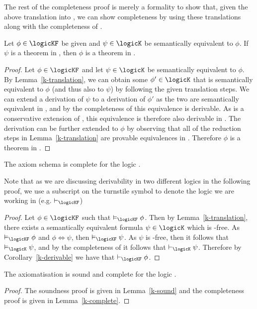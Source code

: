 The rest of the completeness proof is merely a formality to show that, given the
above translation into \logicK{}, we can show completeness by using these
translations along with the completeness of \logicK{}.

\begin{corollary}\label{k-derivable}
Let $\phi \in \logicKF$ be given and $\psi \in \logicK$ be semantically
equivalent to $\phi$.  If $\psi$ is a theorem in \logicK{}, then $\phi$ is a
theorem in \axiomKF{}.
\end{corollary}

\begin{proof}
Let $\phi \in \logicKF$ and let $\psi \in \logicK$ be semantically equivalent to
$\phi$. By Lemma~\ref{k-translation}, we can obtain some $\phi' \in \logicK$
that is semantically equivalent to $\phi$ (and thus also to $\psi$) by following
the given translation steps. We can extend a derivation of $\psi$ to a
derivation of $\phi'$ as the two are semantically equivalent in \logicK{}, and by
the completeness of \logicK{} this equivalence is derivable. As \axiomKF{} is a
conservative extension of \logicK{}, this equivalence is therefore also derivable
in \axiomKF{}. The derivation can be further extended to $\phi$ by observing that all
of the reduction steps in Lemma~\ref{k-translation} are provable equivalences
in \axiomKF{}. Therefore $\phi$ is a theorem in \axiomKF{}.
\end{proof}

\begin{lemma}\label{k-complete}
The axiom schema \axiomKF{} is complete for the logic \logicKF{}.
\end{lemma}

Note that as we are discussing derivability in two different logics in the
following proof, we use a subscript on the turnstile symbol to denote the logic
we are working in (e.g. $\proves_{\logicKF}$)

\begin{proof}
Let $\phi \in \logicKF$ such that $\entails_{\logicKF} \phi$. Then by
Lemma~\ref{k-translation}, there exists a semantically equivalent formula
$\psi \in \logicK$ which is \somerefs-free. As $\entails_{\logicKF} \phi$ and
$\phi \iff \psi$, then $\entails_{\logicKF} \psi$. As $\psi$ is
\somerefs-free, then it follows that $\entails_{\logicK} \psi$, and by the
completeness of \axiomKF{} it follows that $\proves_{\logicK} \psi$.
Therefore by Corollary~\ref{k-derivable} we have that $\proves_{\logicKF}
\phi$.
\end{proof}

\begin{theorem}
The axiomatisation \axiomKF{} is sound and complete for the logic \logicKF{}.
\end{theorem}

\begin{proof}
The soundness proof is given in Lemma~\ref{k-sound} and the completeness
proof is given in Lemma~\ref{k-complete}.
\end{proof}
